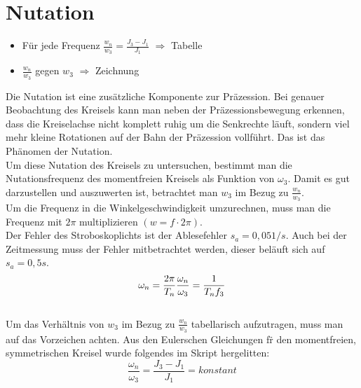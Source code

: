 

\section{Nutation}

\begin{itemize}
    \item Für jede Frequenz $\frac{w_n}{w_3} = \frac{J_3-J_1}{J_1}$ $\Rightarrow$ Tabelle
    \item $\frac{w_n}{w_3}$ gegen $w_3$ $\Rightarrow$ Zeichnung
\end{itemize}

Die Nutation ist eine zus\"atzliche Komponente zur Präzession. Bei genauer Beobachtung des Kreisels kann man neben der Präzessionsbewegung erkennen, dass die Kreiselachse nicht komplett ruhig um die Senkrechte läuft, sondern viel mehr kleine Rotationen auf der Bahn der Präzession vollführt. Das ist das Phänomen der Nutation.\\
Um diese Nutation des Kreisels zu untersuchen, bestimmt man die Nutationsfrequenz des momentfreien Kreisels als Funktion von $\omega_3$. Damit es gut darzustellen und auszuwerten ist, betrachtet man $w_3$ im Bezug zu $\frac{w_n}{w_3}$. \\
Um die Frequenz in die Winkelgeschwindigkeit umzurechnen, muss man die Frequenz mit $2\pi$ multiplizieren $(w = f\cdot2\pi)$.\\
Der Fehler des Stroboskoplichts ist der Ablesefehler $s_a = 0,05 1/s$. 
Auch bei der Zeitmessung muss der Fehler mitbetrachtet werden, dieser beläuft sich auf $s_a = 0,5s$.  \\
\begin{equation}
\omega_n = \frac{2\pi}{T_n}\\
\frac{\omega_n}{\omega_3} = \frac{1}{T_nf_3} 
\end{equation}\\
Um das Verh\"altnis von $w_3$ im Bezug zu $\frac{w_n}{w_3}$ tabellarisch aufzutragen, muss man auf das Vorzeichen achten. Aus den Eulerschen Gleichungen f\"r den momentfreien, symmetrischen Kreisel wurde folgendes im Skript hergelitten:
\begin{equation}
    \frac{\omega_n}{\omega_3} = \frac{J_3 - J_1}{J_1} = konstant
\end{equation}\\
